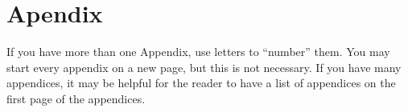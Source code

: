 
\section{Apendix}\label{ap:appendices}
If you have more than one Appendix, use letters to ``number'' them.
You may start every appendix on a new page, but this is not necessary.
If you have many appendices, it may be helpful for the reader to have a list of appendices on the first page of the appendices.